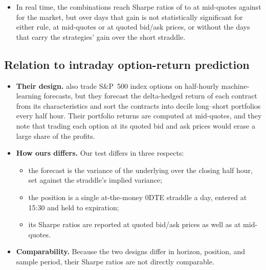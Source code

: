 \begin{itemize}
\begin{itemize}
    risk budget to the strategy.
  \item In real time, the combinations reach Sharpe ratios of \rhebRtIvFullMin{} to \rhebRtMvFullMax{} at mid-quotes
    against \rhebSRmRt{} for the market, but over \rhebNRt{} days that gain is not statistically significant for
    either rule, at mid-quotes or at quoted bid/ask prices, or without the \rhebNBest{} days that carry the
    strategies' gain over the short straddle.
  \end{itemize}
\end{itemize}




\subsection{Relation to intraday option-return prediction}
\label{app:rh_econ_maisch}
\begin{itemize}
\item \textbf{Their design.} \citet{MaischZhangUlrichZimmer2026} also trade S\&P~500 index options on half-hourly
  machine-learning forecasts, but they forecast the delta-hedged return of each contract from its characteristics
  and sort the contracts into decile long--short portfolios every half hour. Their portfolio returns are computed at
  mid-quotes, and they note that trading each option at its quoted bid and ask prices would erase a large share of
  the profits.
\item \textbf{How ours differs.} Our test differs in three respects:
  \begin{itemize}
  \item the forecast is the variance of the underlying over the closing half hour, set against the straddle's
    implied variance;
  \item the position is a single at-the-money 0DTE straddle a day, entered at 15:30 and held to expiration;
  \item its Sharpe ratios are reported at quoted bid/ask prices as well as at mid-quotes.
  \end{itemize}
\item \textbf{Comparability.} Because the two designs differ in horizon, position, and sample period, their Sharpe
  ratios are not directly comparable.
\end{itemize}
